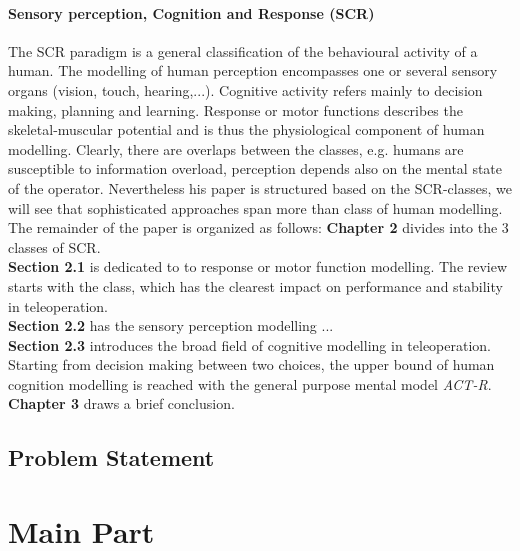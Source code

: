 \documentclass[a4paper,twoside, openright,12pt]{report}
\begin{document}
\subsubsection{Sensory perception, Cognition and Response (SCR)}
The SCR paradigm is a general classification of the behavioural activity of a human. The modelling of human perception encompasses one or several sensory organs (vision, touch, hearing,...). Cognitive activity refers mainly to decision making, planning and learning. Response or motor functions describes the skeletal-muscular potential and is thus the physiological component of human modelling. Clearly, there are overlaps between the classes, e.g. humans are susceptible to information overload, perception depends also on the mental state of the operator. Nevertheless his paper is structured based on the SCR-classes, we will see that sophisticated approaches span more than class of human modelling.\\
The remainder of the paper is organized as follows: \textbf{Chapter 2} divides into the 3 classes of SCR.\\
\textbf{Section 2.1} is dedicated to to response or motor function modelling. The review starts with the class, which has the clearest impact on performance and stability in teleoperation.\\
\textbf{Section 2.2} has the sensory perception modelling ...\\
\textbf{Section 2.3} introduces the broad field of cognitive modelling in teleoperation. Starting from decision making between two choices, the upper bound of human cognition modelling is reached with the general purpose mental model \emph{ACT-R}.\\
\textbf{Chapter 3} draws a brief conclusion.
  




\section{Problem Statement}









\chapter{Main Part}
\end{document}
